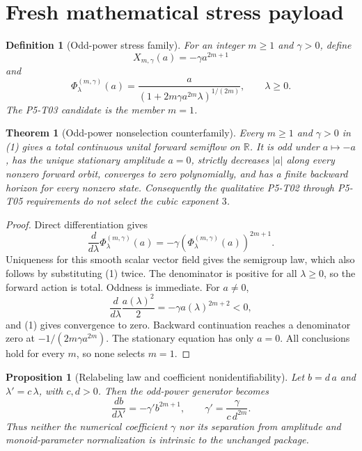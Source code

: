 \documentclass[11pt]{article}
\newtheorem{theorem}{Theorem}
\newtheorem{proposition}{Proposition}
\newtheorem{definition}{Definition}
\newcommand{\Flow}{\Phi}
\begin{document}
\section{Fresh mathematical stress payload}

\begin{definition}[Odd-power stress family]
For an integer \(m\geq1\) and \(\gamma>0\), define
\[
  X_{m,\gamma}(a)=-\gamma a^{2m+1}
\]
and
\[
  \Flow^{(m,\gamma)}_\lambda(a)
  =
  \frac{a}{\left(1+2m\gamma a^{2m}\lambda\right)^{1/(2m)}},
  \qquad \lambda\geq0 .
  \tag{1}
\]
The P5-T03 candidate is the member \(m=1\).
\end{definition}

\begin{theorem}[Odd-power nonselection counterfamily]
\label{thm:counterfamily}
Every \(m\geq1\) and \(\gamma>0\) in (1) gives a total continuous unital
forward semiflow on \(\mathbb R\).  It is odd under \(a\mapsto-a\), has the
unique stationary amplitude \(a=0\), strictly decreases \(|a|\) along every
nonzero forward orbit, converges to zero polynomially, and has a finite
backward horizon for every nonzero state.  Consequently the qualitative
P5-T02 through P5-T05 requirements do not select the cubic exponent \(3\).
\end{theorem}

\begin{proof}
Direct differentiation gives
\[
 \frac{d}{d\lambda}\Flow^{(m,\gamma)}_\lambda(a)
 =-\gamma\left(\Flow^{(m,\gamma)}_\lambda(a)\right)^{2m+1}.
\]
Uniqueness for this smooth scalar vector field gives the semigroup law, which
also follows by substituting (1) twice.  The denominator is positive for all
\(\lambda\geq0\), so the forward action is total.  Oddness is immediate.
For \(a\neq0\),
\[
 \frac{d}{d\lambda}\frac{a(\lambda)^2}{2}
 =-\gamma a(\lambda)^{2m+2}<0,
\]
and (1) gives convergence to zero.  Backward continuation reaches a
denominator zero at
\(-1/(2m\gamma a^{2m})\).  The stationary equation has only \(a=0\).
All conclusions hold for every \(m\), so none selects \(m=1\).
\end{proof}

\begin{proposition}[Relabeling law and coefficient nonidentifiability]
\label{prop:relabel}
Let \(b=d\,a\) and \(\lambda'=c\,\lambda\), with \(c,d>0\).  Then the
odd-power generator becomes
\[
 \frac{db}{d\lambda'}
 =-\gamma' b^{2m+1},
 \qquad
 \gamma'=\frac{\gamma}{c\,d^{2m}}.
 \tag{2}
\]
Thus neither the numerical coefficient \(\gamma\) nor its separation from
amplitude and monoid-parameter normalization is intrinsic to the unchanged
package.
\end{proposition}
\end{document}
